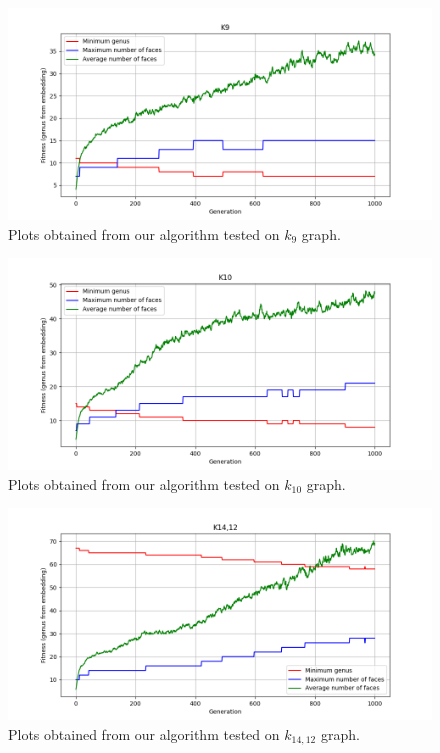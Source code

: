 \documentclass{article}
\begin{document}
\begin{figure}[!tbh]
    \centering
    \label{tests6}
    \includegraphics[scale = 0.5]{k9.png}
    \caption{Plots obtained from our algorithm tested on $k_9$ graph.}
\end{figure}
\begin{figure}[!tbh]
    \centering
    \label{tests7}
    \includegraphics[scale = 0.5]{k10.png}
    \caption{Plots obtained from our algorithm tested on $k_10$ graph.}
\end{figure}
\begin{figure}[!tbh]
    \centering
    \label{tests8}
    \includegraphics[scale = 0.5]{k1412_2.png}
    \caption{Plots obtained from our algorithm tested on $k_{14,12}$ graph.}
\end{figure}
\end{document}
